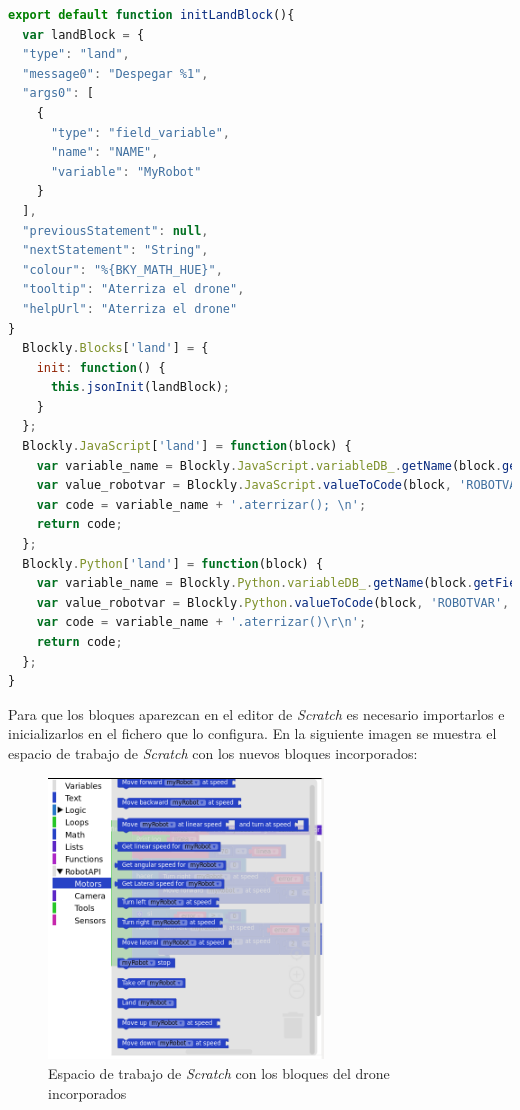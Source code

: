 \begin{lstlisting}[language=javascript,label=lst:tradAterrizar,basicstyle=\tiny]
export default function initLandBlock(){
  var landBlock = {
  "type": "land",
  "message0": "Despegar %1",
  "args0": [
    {
      "type": "field_variable",
      "name": "NAME",
      "variable": "MyRobot"
    }
  ],
  "previousStatement": null,
  "nextStatement": "String",
  "colour": "%{BKY_MATH_HUE}",
  "tooltip": "Aterriza el drone",
  "helpUrl": "Aterriza el drone"
}
  Blockly.Blocks['land'] = {
    init: function() {
      this.jsonInit(landBlock);
    }
  };
  Blockly.JavaScript['land'] = function(block) {
    var variable_name = Blockly.JavaScript.variableDB_.getName(block.getFieldValue('NAME'), Blockly.Variables.NAME_TYPE);
    var value_robotvar = Blockly.JavaScript.valueToCode(block, 'ROBOTVAR', Blockly.JavaScript.ORDER_ATOMIC);
    var code = variable_name + '.aterrizar(); \n';
    return code;
  };
  Blockly.Python['land'] = function(block) {
    var variable_name = Blockly.Python.variableDB_.getName(block.getFieldValue('NAME'), Blockly.Variables.NAME_TYPE);
    var value_robotvar = Blockly.Python.valueToCode(block, 'ROBOTVAR', Blockly.Python.ORDER_ATOMIC);
    var code = variable_name + '.aterrizar()\r\n';
    return code;
  };
}
\end{lstlisting}

Para que los bloques aparezcan en el editor de \textit{Scratch} es necesario importarlos e inicializarlos en el fichero que lo configura. En la siguiente imagen se muestra el espacio de trabajo de \textit{Scratch} con los nuevos bloques incorporados:

\begin{figure}[H]
    \centering            \includegraphics[width=0.65\textwidth]{img/kibotics_newblocks.png}
    \caption{Espacio de trabajo de \textit{Scratch} con los bloques del drone incorporados} 
    \label{fig:newblocks}
\end{figure}

